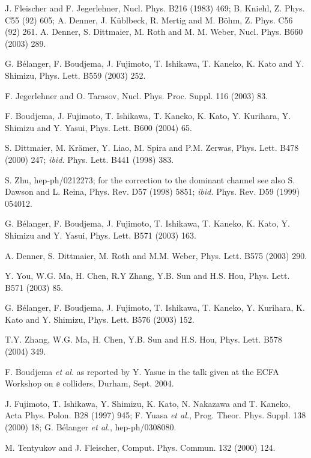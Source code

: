 \begin{thebibliography}{999}
J. Fleischer and F. Jegerlehner, Nucl. Phys. B216 (1983) 469;
B. Kniehl, Z. Phys. C55 (92) 605;
A. Denner, J. K\"ublbeck, R. Mertig and M. B\"ohm, Z. Phys. C56 (92) 261.
%
A. Denner, S. Dittmaier, M. Roth and M. M. Weber, Nucl. Phys. B660 (2003) 289.

G. B\'elanger, F. Boudjema, J. Fujimoto, T. Ishikawa, T. Kaneko, 
K. Kato and Y. Shimizu, Phys. Lett. B559 (2003) 252. 

 F. Jegerlehner and O. Tarasov, Nucl. Phys. Proc. Suppl. 116 (2003) 83.  

 F. Boudjema, J. Fujimoto, T. Ishikawa, T. Kaneko, K. Kato,
Y. Kurihara, Y. Shimizu and Y. Yasui, Phys. Lett. B600 (2004) 65.

 S. Dittmaier, M. Kr\"amer, Y. Liao, M. Spira and P.M. Zerwas,
Phys. Lett. B478 (2000) 247; {\it ibid.} Phys. Lett. B441 (1998) 383. 

 S. Zhu, hep-ph/0212273;  for the correction to the dominant
channel see also S. Dawson and L. Reina,  Phys. Rev. D57 (1998) 5851; {\it 
ibid.} Phys. Rev. D59 (1999) 054012.

 G. B\'elanger, F. Boudjema, J. Fujimoto, T. Ishikawa, 
T. Kaneko, K. Kato, Y. Shimizu and Y. Yasui, Phys. Lett. B571 (2003) 163.  

A. Denner, S. Dittmaier, M. Roth and  M.M. Weber, Phys. Lett. B575 (2003) 290.

Y. You, W.G. Ma, H. Chen, R.Y Zhang, Y.B. Sun and H.S. Hou, 
Phys. Lett. B571 (2003) 85.

  G. B\'elanger, F. Boudjema, J. Fujimoto, T. Ishikawa, 
T. Kaneko, Y. Kurihara, K. Kato and Y. Shimizu, Phys. Lett. B576 (2003) 152.

T.Y. Zhang, W.G. Ma, H. Chen, Y.B. Sun and H.S. Hou, 
Phys. Lett. B578 (2004) 349.

 F. Boudjema {\it et al.} as reported by Y. Yasue in the talk 
given at the ECFA Workshop on $\ee$ colliders, Durham, Sept. 2004. 

 J. Fujimoto, T. Ishikawa, Y. Shimizu, K. Kato, N. Nakazawa and  
T. Kaneko, Acta Phys. Polon. B28 (1997) 945; F. Yuasa {\it et al.},
Prog. Theor. Phys. Suppl. 138 (2000) 18; G. B\'elanger {\it et al.}, hep-ph/0308080.

 M. Tentyukov and J. Fleischer, Comput. Phys. Commun. 132 (2000) 124. 


\end{thebibliography}
